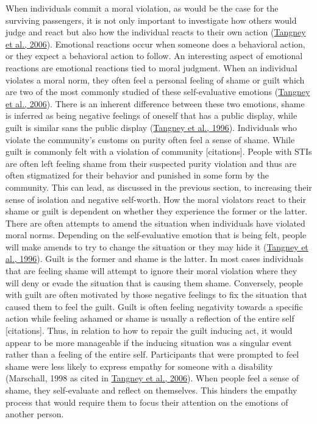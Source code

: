 \documentclass[
  donotrepeattitle,doc, 12pt, a4paper,floatsintext]{apa7}
\begin{document}
When individuals commit a moral violation, as would be the case for the surviving passengers, it is not only important to investigate how others would judge and react but also how the individual reacts to their own action (\protect\hyperlink{ref-tangney2006}{Tangney et al., 2006}). Emotional reactions occur when someone does a behavioral action, or they expect a behavioral action to follow. An interesting aspect of emotional reactions are emotional reactions tied to moral judgment. When an individual violates a moral norm, they often feel a personal feeling of shame or guilt which are two of the most commonly studied of these self-evaluative emotions (\protect\hyperlink{ref-tangney2006}{Tangney et al., 2006}). There is an inherent difference between these two emotions, shame is inferred as being negative feelings of oneself that has a public display, while guilt is similar sans the public display (\protect\hyperlink{ref-tangney1996}{Tangney et al., 1996}). Individuals who violate the community's customs on purity often feel a sense of shame. While guilt is commonly felt with a violation of community {[}citations{]}. People with STIs are often left feeling shame from their suspected purity violation and thus are often stigmatized for their behavior and punished in some form by the community. This can lead, as discussed in the previous section, to increasing their sense of isolation and negative self-worth. How the moral violators react to their shame or guilt is dependent on whether they experience the former or the latter.
There are often attempts to amend the situation when individuals have violated moral norms. Depending on the self-evaluative emotion that is being felt, people will make amends to try to change the situation or they may hide it (\protect\hyperlink{ref-tangney1996}{Tangney et al., 1996}). Guilt is the former and shame is the latter. In most cases individuals that are feeling shame will attempt to ignore their moral violation where they will deny or evade the situation that is causing them shame. Conversely, people with guilt are often motivated by those negative feelings to fix the situation that caused them to feel the guilt. Guilt is often feeling negativity towards a specific action while feeling ashamed or shame is usually a reflection of the entire self {[}citations{]}. Thus, in relation to how to repair the guilt inducing act, it would appear to be more manageable if the inducing situation was a singular event rather than a feeling of the entire self. Participants that were prompted to feel shame were less likely to express empathy for someone with a disability (Marschall, 1998 as cited in \protect\hyperlink{ref-tangney2006}{Tangney et al., 2006}). When people feel a sense of shame, they self-evaluate and reflect on themselves. This hinders the empathy process that would require them to focus their attention on the emotions of another person.
\end{document}
